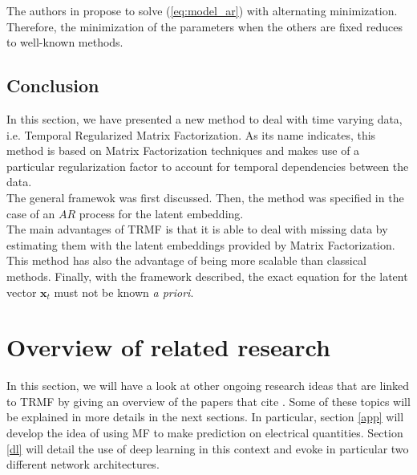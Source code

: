 \documentclass{article}
\begin{document}
The authors in \cite{TRMF} propose to solve (\ref{eq:model_ar}) with alternating minimization. Therefore, the minimization of the parameters when the others are fixed reduces to well-known methods.

\subsection*{Conclusion}
In this section, we have presented a new method to deal with time varying data, i.e. Temporal Regularized Matrix Factorization. As its name indicates, this method is based on Matrix Factorization techniques and makes use of a particular regularization factor to account for temporal dependencies between the data. \\
The general framewok was first discussed. Then, the method was specified in the case of an $AR$ process for the latent embedding. \\
The main advantages of TRMF is that it is able to deal with missing data by estimating them with the latent embeddings provided by Matrix Factorization. This method has also the advantage of being more scalable than classical methods. Finally, with the framework described, the exact equation for the latent vector $\mathbf{x}_t$ must not be known \emph{a priori}.

\section{Overview of related research}
\label{over}
In this section, we will have a look at other ongoing research ideas that are linked to TRMF by giving an overview of the papers that cite \cite{TRMF}. Some of these topics will be explained in more details in the next sections. In particular, section \ref{app} will develop the idea of using MF to make prediction on electrical quantities. Section \ref{dl} will detail the use of deep learning in this context and evoke in particular two different network architectures. \\
\end{document}

